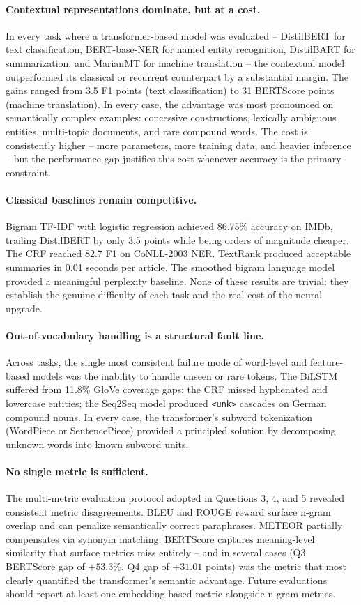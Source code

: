\documentclass[11pt,a4paper]{article}
\begin{document}
\paragraph{Contextual representations dominate, but at a cost.}
In every task where a transformer-based model was evaluated -- DistilBERT for
text classification, BERT-base-NER for named entity recognition, DistilBART for
summarization, and MarianMT for machine translation -- the contextual model
outperformed its classical or recurrent counterpart by a substantial margin.
The gains ranged from 3.5 F1 points (text classification) to 31 BERTScore
points (machine translation). In every case, the advantage was most pronounced
on semantically complex examples: concessive constructions, lexically ambiguous
entities, multi-topic documents, and rare compound words. The cost is
consistently higher -- more parameters, more training data, and heavier
inference -- but the performance gap justifies this cost whenever accuracy is
the primary constraint.

\paragraph{Classical baselines remain competitive.}
Bigram TF-IDF with logistic regression achieved 86.75\% accuracy on IMDb,
trailing DistilBERT by only 3.5 points while being orders of magnitude cheaper.
The CRF reached 82.7 F1 on CoNLL-2003 NER. TextRank produced acceptable
summaries in 0.01 seconds per article. The smoothed bigram language model
provided a meaningful perplexity baseline. None of these results are trivial:
they establish the genuine difficulty of each task and the real cost of the
neural upgrade.

\paragraph{Out-of-vocabulary handling is a structural fault line.}
Across tasks, the single most consistent failure mode of word-level and
feature-based models was the inability to handle unseen or rare tokens.
The BiLSTM suffered from 11.8\% GloVe coverage gaps; the CRF missed
hyphenated and lowercase entities; the Seq2Seq model produced \texttt{<unk>}
cascades on German compound nouns. In every case, the transformer's subword
tokenization (WordPiece or SentencePiece) provided a principled solution by
decomposing unknown words into known subword units.

\paragraph{No single metric is sufficient.}
The multi-metric evaluation protocol adopted in Questions 3, 4, and 5 revealed
consistent metric disagreements. BLEU and ROUGE reward surface n-gram overlap
and can penalize semantically correct paraphrases. METEOR partially compensates
via synonym matching. BERTScore captures meaning-level similarity that surface
metrics miss entirely -- and in several cases (Q3 BERTScore gap of $+53.3\%$,
Q4 gap of $+31.01$ points) was the metric that most clearly quantified the
transformer's semantic advantage. Future evaluations should report at least
one embedding-based metric alongside n-gram metrics.
\end{document}
